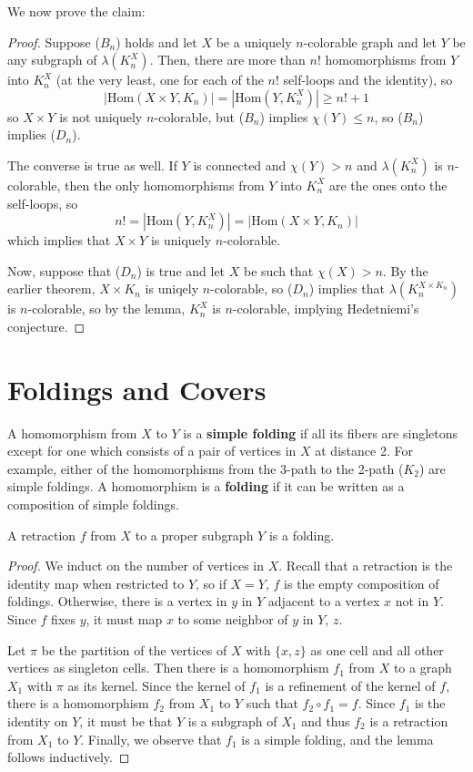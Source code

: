 We now prove the claim:

\begin{proof}
	Suppose ($B_n$) holds and let $X$ be a uniquely $n$-colorable graph and let $Y$ be any subgraph of $\lambda(K_n^X)$.  Then, there are more than $n!$ homomorphisms from $Y$ into $K_n^X$ (at the very least, one for each of the $n!$ self-loops and the identity), so $$|\mathrm{Hom}(X\times Y,K_n)|=|\mathrm{Hom}(Y,K^X_n)|\geq n!+1$$ so $X\times Y$ is not uniquely $n$-colorable, but ($B_n$) implies $\chi(Y)\leq n$, so ($B_n$) implies ($D_n$).
	
	The converse is true as well.  If $Y$ is connected and $\chi(Y)>n$ and $\lambda(K^X_n)$ is $n$-colorable, then the only homomorphisms from $Y$ into $K^X_n$ are the ones onto the self-loops, so $$n!=|\mathrm{Hom}(Y,K^X_n)|=|\mathrm{Hom}(X\times Y,K_n)|$$ which implies that $X\times Y$ is uniquely $n$-colorable.
	
	Now, suppose that ($D_n$) is true and let $X$ be such that $\chi(X)>n$.  By the earlier theorem, $X\times K_n$ is uniqely $n$-colorable, so ($D_n$) implies that $\lambda(K_n^{X\times K_n})$ is $n$-colorable, so by the lemma, $K^X_n$ is $n$-colorable, implying Hedetniemi's conjecture.
\end{proof}


\section*{Foldings and Covers}



A homomorphism from $X$ to $Y$ is a \textbf{simple folding} if all its fibers are singletons except for one which consists of a pair of vertices in $X$ at distance 2.  For example, either of the homomorphisms from the 3-path to the 2-path ($K_2$) are simple foldings.  A homomorphism is a \textbf{folding} if it can be written as a composition of simple foldings.

\begin{lemma}
	A retraction $f$ from $X$ to a proper subgraph $Y$ is a folding.  
\end{lemma}

\begin{proof}
We induct on the number of vertices in $X$.  Recall that a retraction is the identity map when restricted to $Y$, so if $X=Y$, $f$ is the empty composition of foldings.  Otherwise, there is a vertex in $y$ in $Y$ adjacent to a vertex $x$ not in $Y$.  Since $f$ fixes $y$, it must map $x$ to some neighbor of $y$ in $Y$, $z$.

Let $\pi$ be the partition of the vertices of $X$ with $\{x,z\}$ as one cell and all other vertices as singleton cells.  Then there is a homomorphism $f_1$ from $X$ to a graph $X_1$ with $\pi$ as its kernel.  Since the kernel of $f_1$ is a refinement of the kernel of $f$, there is a homomorphism $f_2$ from $X_1$ to $Y$ such that $f_2\circ f_1=f$.  Since $f_1$ is the identity on $Y$, it must be that $Y$ is a subgraph of $X_1$ and thus $f_2$ is a retraction from $X_1$ to $Y$.  Finally, we observe that $f_1$ is a simple folding, and the lemma follows inductively.
\end{proof}


